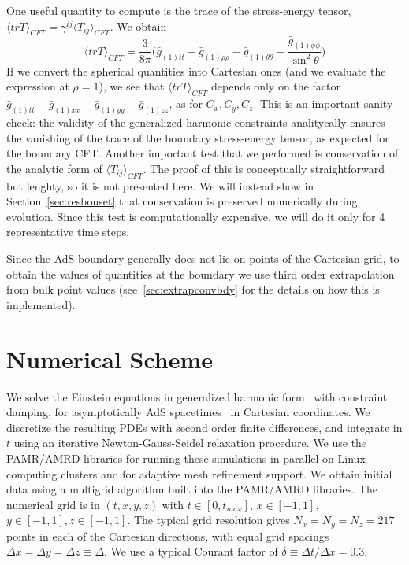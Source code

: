 \documentclass[a4paper,11pt]{article}
\numberwithin{equation}{section}
\begin{document}
One useful quantity to compute is the trace of the stress-energy tensor, $\langle trT\rangle_{CFT}=\gamma^{ij} \langle T_{ij}\rangle_{CFT}$. We obtain
\begin{equation}
\langle trT\rangle_{CFT}=\frac{3}{8\pi}\biggl(\bar{g}_{(1)tt}-\bar{g}_{(1)\rho\rho}-\bar{g}_{(1)\theta\theta}-\frac{\bar{g}_{(1)\phi\phi}}{\sin^2\theta}\biggr)
\end{equation}
If we convert the spherical quantities into Cartesian ones (and we evaluate the expression at $\rho=1$), we see that $\langle trT\rangle_{CFT}$ depends only on the factor $\bar{g}_{(1)tt}-\bar{g}_{(1)xx}-\bar{g}_{(1)yy}-\bar{g}_{(1)zz}$, as for $C_x,C_y,C_z$. This is an important sanity check: the validity of the generalized harmonic constraints analitycally ensures the vanishing of the trace of the boundary stress-energy tensor, as expected for the boundary CFT.
Another important test that we performed is conservation of the analytic form of $\langle T_{ij}\rangle_{CFT}$. The proof of this is conceptually straightforward but lenghty, so it is not presented here. We will instead show in Section~\ref{sec:resbouset} that conservation is preserved numerically during evolution. Since this test is computationally expensive, we will do it only for 4 representative time steps.

Since the AdS boundary generally does not lie on points of the Cartesian grid, to obtain the values of quantities at the boundary we use third order extrapolation from bulk point values (see~\ref{sec:extrapconvbdy} for the details on how this is implemented).

\section{Numerical Scheme}\label{sec:numerical_scheme}

We solve the Einstein equations in generalized harmonic form~\cite{Pretorius:2004jg} with constraint damping, for asymptotically AdS spacetimes~\cite{Bantilan:2012vu} in Cartesian coordinates.
We discretize the resulting PDEs with second order finite differences, and integrate in $t$ using an iterative Newton-Gauss-Seidel relaxation procedure. 
We use the PAMR/AMRD libraries \cite{PAMR} for running these simulations in parallel on Linux computing clusters and for adaptive mesh refinement support.
We obtain initial data using a multigrid algorithm built into the PAMR/AMRD libraries.
The numerical grid is in $(t,x,y,z)$ with $t \in [0,t_{max}]$, $x \in [-1,1]$, $y \in [-1,1], z \in [-1,1]$.
The typical grid resolution gives $N_x=N_y=N_z=217$ points in each of the Cartesian directions, with equal grid spacings $\Delta x = \Delta y = \Delta z\equiv \Delta$.
We use a typical Courant factor of $\delta \equiv \Delta t / \Delta x = 0.3$.
\end{document}
